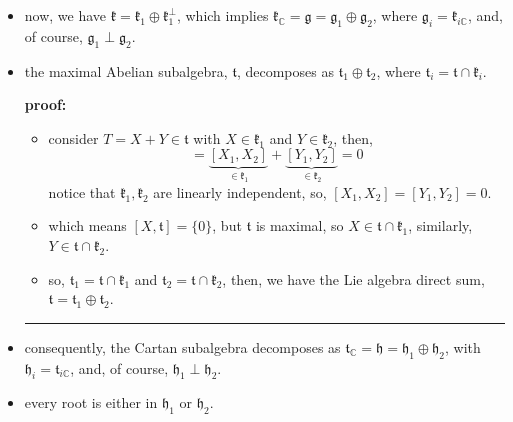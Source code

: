 \begin{itemize}
\begin{tcolorbox}[title=proof:]
\begin{itemize}
			\item now, we have $\mathfrak{k} = \mathfrak{k}_1 \oplus \mathfrak{k}_1^\perp$, which implies $\mathfrak{k}_\mathbb{C} = \mathfrak{g} = \mathfrak{g}_1 \oplus \mathfrak{g}_2$, where $\mathfrak{g}_i = \mathfrak{k}_{i \mathbb{C}}$, and, of course, $\mathfrak{g}_1 \perp \mathfrak{g}_2$.
			
			\item the maximal Abelian subalgebra, $\mathfrak{t}$, decomposes as $\mathfrak{t}_1 \oplus \mathfrak{t}_2$, where $\mathfrak{t}_i = \mathfrak{t} \cap \mathfrak{k}_i$.
			
			\noindent\hdashrule[0.5ex]{\linewidth}{0.5pt}{1mm} %
			
			\textbf{proof:}
			
			\begin{itemize}
				\item consider $T = X + Y \in \mathfrak{t}$ with $X \in \mathfrak{k}_1$ and $Y \in \mathfrak{k}_2$, then,
				\begin{equation}
					[T_1, T_2] = \underbrace{[X_1, X_2]}_{\in \mathfrak{k}_1} + \underbrace{[Y_1, Y_2]}_{\in \mathfrak{k}_2} = 0
				\end{equation}
				notice that $\mathfrak{k}_1, \mathfrak{k}_2$ are linearly independent, so, $[X_1, X_2] = [Y_1, Y_2] = 0$.
				
				\item which means $[X, \mathfrak{t}] = \{0\}$, but $\mathfrak{t}$ is maximal, so $X \in \mathfrak{t} \cap \mathfrak{k}_1$, similarly, $Y \in \mathfrak{t} \cap \mathfrak{k}_2$.
				
				\item so, $\mathfrak{t}_1 = \mathfrak{t} \cap \mathfrak{k}_1$ and $\mathfrak{t}_2 = \mathfrak{t} \cap \mathfrak{k}_2$, then, we have the Lie algebra direct sum, $\mathfrak{t} = \mathfrak{t}_1 \oplus \mathfrak{t}_2$.
			\end{itemize}
			
			\noindent\rule[0.5ex]{\linewidth}{0.5pt} %
			
			\item consequently, the Cartan subalgebra decomposes as $\mathfrak{t}_\mathbb{C} = \mathfrak{h} = \mathfrak{h}_1 \oplus \mathfrak{h}_2$, with $\mathfrak{h}_i = \mathfrak{t}_{i \mathbb{C}}$, and, of course, $\mathfrak{h}_1 \perp \mathfrak{h}_2$.
			
			\item every root is either in $\mathfrak{h}_1$ or $\mathfrak{h}_2$.
			

\end{itemize}
\end{tcolorbox}
\end{itemize}
